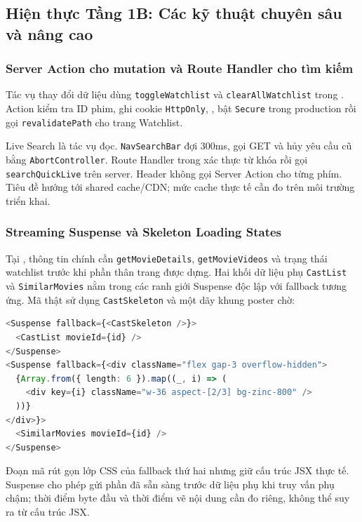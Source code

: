 \documentclass[12pt,a4paper]{extarticle}
\begin{document}
\subsection{Hiện thực Tầng 1B: Các kỹ thuật chuyên sâu và nâng cao}

\subsubsection{Server Action cho mutation và Route Handler cho tìm kiếm}
Tác vụ thay đổi dữ liệu dùng \texttt{toggleWatchlist} và \texttt{clearAllWatchlist} trong . Action kiểm tra ID phim, ghi cookie \texttt{HttpOnly}, , bật \texttt{Secure} trong production rồi gọi \texttt{revalidatePath} cho trang Watchlist.

Live Search là tác vụ đọc. \texttt{NavSearchBar} đợi 300ms, gọi GET  và hủy yêu cầu cũ bằng \texttt{AbortController}. Route Handler trong  xác thực từ khóa rồi gọi \texttt{searchQuickLive} trên server. Header không gọi Server Action cho từng phím. Tiêu đề  hướng tới shared cache/CDN; mức cache thực tế cần đo trên môi trường triển khai.


\subsubsection{Streaming Suspense và Skeleton Loading States}
Tại , thông tin chính cần \texttt{getMovieDetails}, \texttt{getMovieVideos} và trạng thái watchlist trước khi phần thân trang được dựng. Hai khối dữ liệu phụ \texttt{CastList} và \texttt{SimilarMovies} nằm trong các ranh giới Suspense độc lập với fallback tương ứng. Mã thật sử dụng \texttt{CastSkeleton} và một dãy khung poster chờ:
\begin{lstlisting}[language=TypeScript]
<Suspense fallback={<CastSkeleton />}>
  <CastList movieId={id} />
</Suspense>
<Suspense fallback={<div className="flex gap-3 overflow-hidden">
  {Array.from({ length: 6 }).map((_, i) => (
    <div key={i} className="w-36 aspect-[2/3] bg-zinc-800" />
  ))}
</div>}>
  <SimilarMovies movieId={id} />
</Suspense>
\end{lstlisting}
Đoạn mã rút gọn lớp CSS của fallback thứ hai nhưng giữ cấu trúc JSX thực tế. Suspense cho phép gửi phần đã sẵn sàng trước dữ liệu phụ khi truy vấn phụ chậm; thời điểm byte đầu và thời điểm vẽ nội dung cần đo riêng, không thể suy ra từ cấu trúc JSX.
\end{document}
